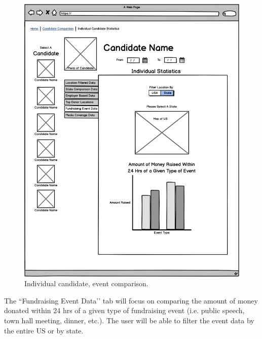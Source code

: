 \documentclass[12pt]{article}
\begin{document}
    \begin{figure}[H]
        \begin{center}
        \includegraphics[scale=.30]{candidateevent}
        \caption{Individual candidate, event comparison.}
        \label{fig:12}
        \end{center}
    \end{figure}
    The ``Fundraising Event Data’’ tab will focus on comparing the amount of money donated within 24 hrs of a given type of fundraising event (i.e. public speech, town hall meeting, dinner, etc.). The user will be able to filter the event data by the entire US or by state.
\end{document}
